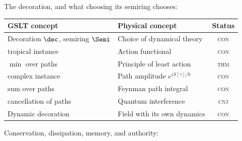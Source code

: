 The decoration, and what choosing its semiring chooses:

\begin{center}
\renewcommand{\arraystretch}{1.3}
\begin{tabular}{p{4.9cm} p{5.6cm} c}
\toprule
\textbf{GSLT concept} & \textbf{Physical concept} & \textbf{Status} \\
\midrule
Decoration $\dec$, semiring $\Semi$ & Choice of dynamical theory & \textsc{con} \\
\quad tropical instance & Action functional & \textsc{con} \\
\quad $\min$ over paths & Principle of least action & \textsc{thm} \\
\quad complex instance & Path amplitude $e^{iS[\gamma]/\hbar}$ & \textsc{con} \\
\quad sum over paths & Feynman path integral & \textsc{con} \\
\quad cancellation of paths & Quantum interference & \textsc{cnj} \\
Dynamic decoration & Field with its own dynamics & \textsc{con} \\
\bottomrule
\end{tabular}
\end{center}

Conservation, dissipation, memory, and authority:

